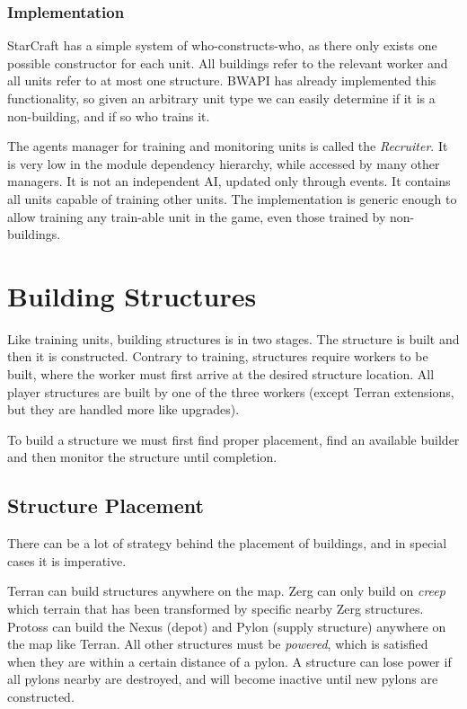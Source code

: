 		\subsubsection*{Implementation}
		StarCraft has a simple system of who-constructs-who, as there only exists one possible constructor for each unit. All buildings refer to the relevant worker and all units refer to at most one structure. BWAPI has already implemented this functionality, so given an arbitrary unit type we can easily determine if it is a non-building, and if so who trains it.
		
		
		The agents manager for training and monitoring units is called the \emph{Recruiter}. It is very low in the module dependency hierarchy, while accessed by many other managers. It is not an independent AI, updated only through events. It contains all units capable of training other units. The implementation is generic enough to allow training any train-able unit in the game, even those trained by non-buildings.

\section{Building Structures}
Like training units, building structures is in two stages. The structure is built and then it is constructed. Contrary to training, structures require workers to be built, where the worker must first arrive at the desired structure location. All player structures are built by one of the three workers (except Terran extensions, but they are handled more like upgrades).

To build a structure we must first find proper placement, find an available builder and then monitor the structure until completion.

	\subsection*{Structure Placement}
	There can be a lot of strategy behind the placement of buildings, and in special cases it is imperative.
	
	Terran can build structures anywhere on the map. Zerg can only build on \emph{creep} which terrain that has been transformed by specific nearby Zerg structures. Protoss can build the Nexus (depot) and Pylon (supply structure) anywhere on the map like Terran. All other structures must be \emph{powered}, which is satisfied when they are within a certain distance of a pylon. A structure can lose power if all pylons nearby are destroyed, and will become inactive until new pylons are constructed.
	
